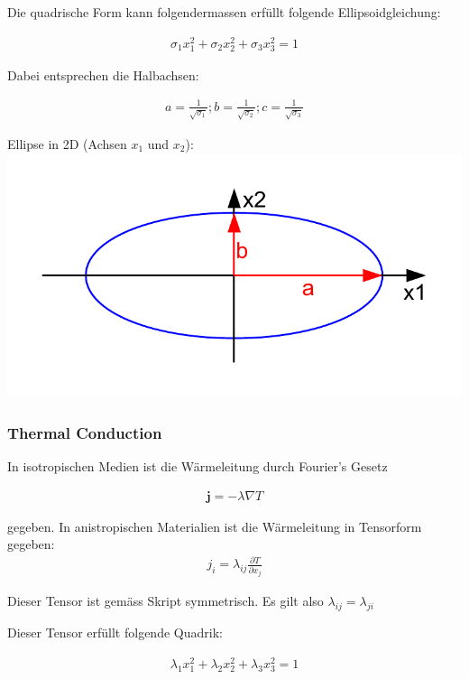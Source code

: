 \documentclass[a4paper, 10pt]{scrartcl}
\begin{document}
Die quadrische Form kann folgendermassen erfüllt folgende Ellipsoidgleichung:

\begin{align}
	\sigma_1x_1^2+\sigma_2x_2^2+\sigma_3x_3^2=1
\end{align}


Dabei entsprechen die Halbachsen:

\begin{align}
	a=\frac{1}{\sqrt{\sigma_1}}; b=\frac{1}{\sqrt{\sigma_2}};
	c=\frac{1}{\sqrt{\sigma_3}}
\end{align}

\begin{center}
	Ellipse in 2D (Achsen $x_1$ und $x_2$):\\
	\includegraphics[scale=0.8]{images/quadrik_2d_ellipse.pdf}
\end{center}

\subsubsection{Thermal Conduction}
In isotropischen Medien ist die Wärmeleitung durch Fourier's Gesetz

\begin{align}
	\mathbf{j}=-\lambda \nabla T
\end{align}

gegeben. In anistropischen Materialien ist die Wärmeleitung in Tensorform
gegeben:
\begin{align}
	j_i=\lambda_{ij}\frac{\partial T}{\partial x_j}
\end{align}

Dieser Tensor ist gemäss Skript symmetrisch. Es gilt also
$\lambda_{ij}=\lambda_{ji}$

Dieser Tensor erfüllt folgende Quadrik:

\begin{align}
	\lambda_1 x_1^2+\lambda_2 x_2^2+\lambda_3 x_3^2=1
\end{align}
\end{document}
